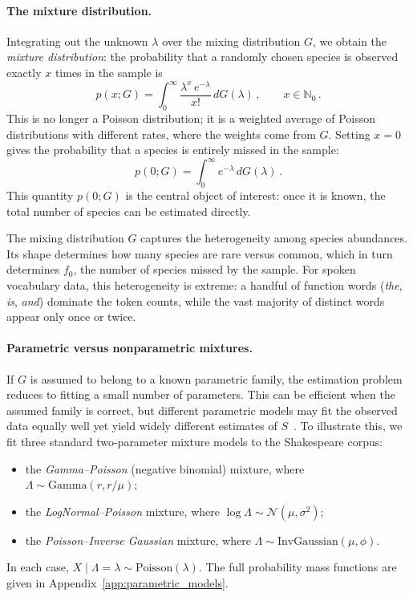 \documentclass{article}
\begin{document}
{\paragraph{The mixture distribution.}
Integrating out the unknown $\lambda$ over the mixing distribution $G$, we obtain the \emph{mixture distribution}: the probability that a randomly chosen species is observed exactly $x$ times in the sample is
\begin{equation}\label{eq:poisson_mixture}
    p(x; G) = \int_0^{\infty} \frac{\lambda^x \, e^{-\lambda}}{x!} 
    \, dG(\lambda)\,, \qquad x \in \mathbb{N}_0\,.
\end{equation}
This is no longer a Poisson distribution; it is a weighted average of Poisson distributions with different rates, where the weights come from $G$. Setting $x = 0$ gives the probability that a species is entirely missed in the sample:
\begin{equation}\label{eq:p0}
    p(0; G) = \int_0^{\infty} e^{-\lambda} \, dG(\lambda)\,.
\end{equation}
This quantity $p(0;G)$ is the central object of interest: once it is known, the total number of species can be estimated directly.


The mixing distribution $G$ captures the heterogeneity among species abundances. Its shape determines how many species are rare versus common, which in turn determines $f_0$, the number of species missed by the sample. For spoken vocabulary data, this heterogeneity is extreme: a handful of function words (\emph{the}, \emph{is}, \emph{and}) dominate the token counts, while the vast majority of distinct words appear only once or twice.

\paragraph{Parametric versus nonparametric mixtures.}
If $G$ is assumed to belong to a known parametric family, the estimation
problem reduces to fitting a small number of parameters. This can be
efficient when the assumed family is correct, but different parametric
models may fit the observed data equally well yet yield widely different
estimates of $S$~\cite{chao2016species}. To illustrate this, we fit three
standard two-parameter mixture models to the Shakespeare corpus:
\begin{itemize}
    \item the \emph{Gamma--Poisson} (negative binomial) mixture, where
          $\Lambda \sim \mathrm{Gamma}(r, r/\mu)$;
    \item the \emph{LogNormal--Poisson} mixture, where
          $\log\Lambda \sim \mathcal{N}(\mu, \sigma^2)$;
    \item the \emph{Poisson--Inverse Gaussian} mixture, where
          $\Lambda \sim \mathrm{InvGaussian}(\mu, \phi)$.
\end{itemize}
In each case, $X \mid \Lambda = \lambda \sim \mathrm{Poisson}(\lambda)$.
The full probability mass functions are given in
Appendix~\ref{app:parametric_models}.

}
\end{document}
